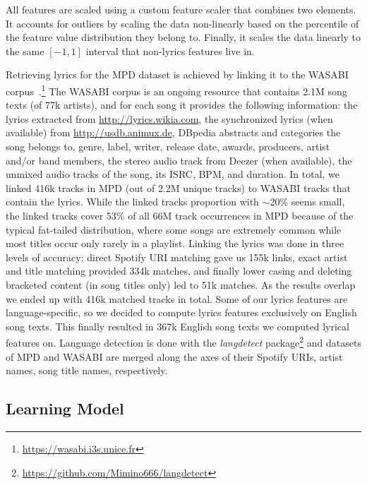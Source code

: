 All features are scaled using a custom feature scaler that combines two elements. It accounts for outliers by scaling the data non-linearly based on the percentile of the feature value distribution they belong to. Finally, it scales the data linearly to the same $[-1,1]$ interval that non-lyrics features live in.

Retrieving lyrics for the MPD dataset is achieved by linking it to the WASABI corpus~\cite{Meseguer2017}.\footnote{\url{https://wasabi.i3s.unice.fr}} The WASABI corpus is an ongoing resource that contains 2.1M song texts (of 77k artists), and for each song it provides the following information: the lyrics extracted from \url{http://lyrics.wikia.com}, the synchronized lyrics (when available) from \url{http://usdb.animux.de}, DBpedia abstracts and categories the song belongs to, genre, label, writer, release date, awards, producers, artist and/or band members, the stereo audio track from Deezer (when available), the unmixed audio tracks of the song, its ISRC, BPM, and duration. In total, we linked 416k tracks in MPD (out of 2.2M unique tracks) to WASABI tracks that contain the lyrics. While the linked tracks proportion with $\sim$20\% seems small, the linked tracks cover 53\% of all 66M track occurrences in MPD because of the typical fat-tailed distribution, where some songs are extremely common while most titles occur only rarely in a playlist. Linking the lyrics was done in three levels of accuracy: direct Spotify URI matching gave us 155k links, exact artist and title matching provided 334k matches, and finally lower casing and deleting bracketed content (in song titles only) led to 51k matches. As the results overlap we ended up with 416k matched tracks in total. Some of our lyrics features are language-specific, so we decided to compute lyrics features exclusively on English song texts. This finally resulted in 367k English song texts we computed lyrical features on. Language detection is done with the \textit{langdetect} package\footnote{\url{https://github.com/Mimino666/langdetect}} and datasets of MPD and WASABI are merged along the axes of their Spotify URIs, artist names, song title names, respectively.

\subsection{Learning Model}

